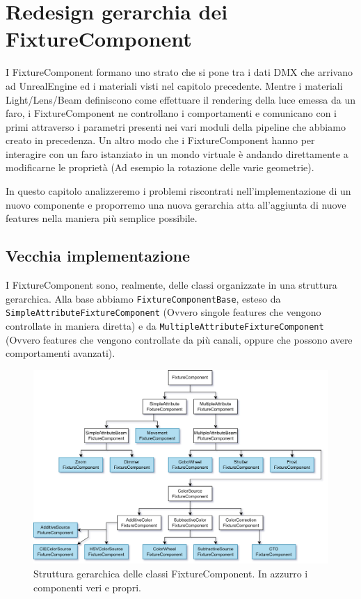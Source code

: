 \documentclass[main.tex]{subfiles}
\begin{document}
\sloppy


\vspace{1.0cm}

\section{Redesign gerarchia dei FixtureComponent}\label{sec:FixtureComponentHierachy}
I FixtureComponent formano uno strato che si pone tra i dati DMX che arrivano ad UnrealEngine ed i materiali visti nel capitolo precedente. Mentre i materiali Light/Lens/Beam definiscono come effettuare il rendering della luce emessa da un faro, i FixtureComponent ne controllano i comportamenti e comunicano con i primi attraverso i parametri presenti nei vari moduli della pipeline che abbiamo creato in precedenza. Un altro modo che i FixtureComponent hanno per interagire con un faro istanziato in un mondo virtuale è andando direttamente a modificarne le proprietà (Ad esempio la rotazione delle varie geometrie). \newline

In questo capitolo analizzeremo i problemi riscontrati nell'implementazione di un nuovo componente e proporremo una nuova gerarchia atta all'aggiunta di nuove features nella maniera più semplice possibile.

\subsection{Vecchia implementazione}\label{subsec:3_oldImplementation}
I FixtureComponent sono, realmente, delle classi organizzate in una struttura gerarchica. Alla base abbiamo \lstinline{FixtureComponentBase}, esteso da \lstinline{SimpleAttributeFixtureComponent} (Ovvero singole features che vengono controllate in maniera diretta) e da \lstinline{MultipleAttributeFixtureComponent} (Ovvero features che vengono controllate da più canali, oppure che possono avere comportamenti avanzati).
\begin{figure}[H]
    \centering
    \includegraphics[width=0.9\linewidth]{img/fixtureComponent/FixtureComponentOLD.drawio.png}
    \caption{Struttura gerarchica delle classi FixtureComponent. In azzurro i componenti veri e propri.}
    \label{fig:3_fixtureComponentOld}
\end{figure}
\end{document}

